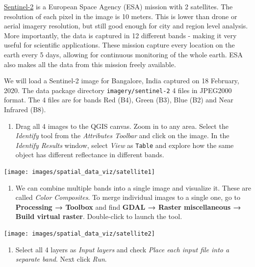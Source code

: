 \documentclass[
  12pt,
  a4paper]{article}
\providecommand{\tightlist}{%
  \setlength{\itemsep}{0pt}\setlength{\parskip}{0pt}}
\begin{document}
\href{https://sentinel.esa.int/web/sentinel/missions/sentinel-2}{Sentinel-2}
is a European Space Agency (ESA) mission with 2 satellites. The
resolution of each pixel in the image is 10 meters. This is lower than
drone or aerial imagery resolution, but still good enough for city and
region level analysis. More importantly, the data is captured in 12
different bands - making it very useful for scientific applications.
These mission capture every location on the earth every 5 days, allowing
for continuous monitoring of the whole earth. ESA also makes all the
data from this mission freely available.

We will load a Sentinel-2 image for Bangalore, India captured on 18
February, 2020. The data package directory \texttt{imagery/sentinel-2} 4
files in JPEG2000 format. The 4 files are for bands Red (B4), Green
(B3), Blue (B2) and Near Infrared (B8).

\begin{enumerate}
\def\labelenumi{\arabic{enumi}.}
\tightlist
\item
  Drag all 4 images to the QGIS canvas. Zoom in to any area. Select the
  \emph{Identify} tool from the \emph{Attributes Toolbar} and click on
  the image. In the \emph{Identify Results} window, select \emph{View}
  as \texttt{Table} and explore how the same object has different
  reflectance in different bands.
\end{enumerate}

\begin{center}\texttt{[image: images/spatial\_data\_viz/satellite1]} \end{center}

\begin{enumerate}
\def\labelenumi{\arabic{enumi}.}
\setcounter{enumi}{1}
\tightlist
\item
  We can combine multiple bands into a single image and visualize it.
  These are called \emph{Color Composites}. To merge individual images
  to a single one, go to \textbf{Processing → Toolbox} and find
  \textbf{GDAL → Raster miscellaneous → Build virtual raster}.
  Double-click to launch the tool.
\end{enumerate}

\begin{center}\texttt{[image: images/spatial\_data\_viz/satellite2]} \end{center}

\begin{enumerate}
\def\labelenumi{\arabic{enumi}.}
\setcounter{enumi}{2}
\tightlist
\item
  Select all 4 layers as \emph{Input layers} and check \emph{Place each
  input file into a separate band}. Next click \emph{Run}.
\end{enumerate}
\end{document}

